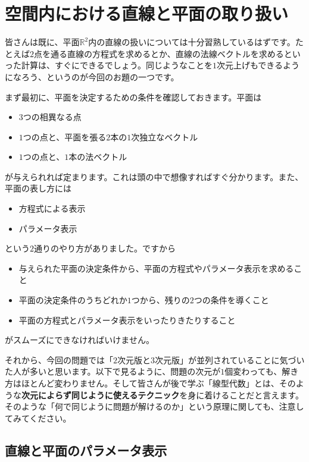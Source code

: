 \section{空間内における直線と平面の取り扱い}

皆さんは既に、平面$\mathbb{R}^2$内の直線の扱いについては十分習熟しているはずです。たとえば$2$点を通る直線の方程式を求めるとか、直線の法線ベクトルを求めるといった計算は、すぐにできるでしょう。同じようなことを$1$次元上げもできるようになろう、というのが今回のお題の一つです。

まず最初に、平面を決定するための条件を確認しておきます。平面は
\begin{itemize}
\item $3$つの相異なる点
\item $1$つの点と、平面を張る$2$本の$1$次独立なベクトル
\item $1$つの点と、$1$本の法ベクトル
\end{itemize}
が与えられれば定まります。これは頭の中で想像すればすぐ分かります。また、平面の表し方には
\begin{itemize}
\item 方程式による表示
\item パラメータ表示
\end{itemize}
という$2$通りのやり方がありました。ですから
\begin{itemize}
\item 与えられた平面の決定条件から、平面の方程式やパラメータ表示を求めること
\item 平面の決定条件のうちどれか$1$つから、残りの$2$つの条件を導くこと
\item 平面の方程式とパラメータ表示をいったりきたりすること
\end{itemize}
がスムーズにできなければいけません。

それから、今回の問題では「$2$次元版と$3$次元版」が並列されていることに気づいた人が多いと思います。以下で見るように、問題の次元が$1$個変わっても、解き方はほとんど変わりません。そして皆さんが後で学ぶ「線型代数」とは、そのような\textbf{次元によらず同じように使えるテクニック}を身に着けることだと言えます。そのような「何で同じように問題が解けるのか」という原理に関しても、注意してみてください。

\subsection{直線と平面のパラメータ表示}


